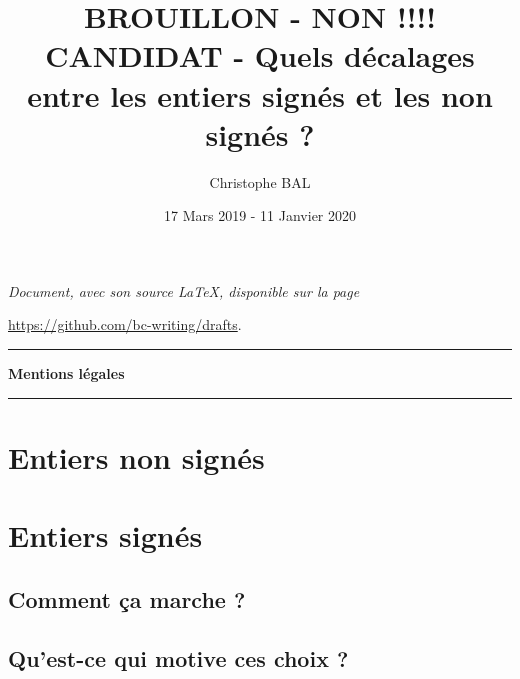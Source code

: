 \documentclass[12pt]{amsart}
\begin{document}
\title{BROUILLON - NON !!!! CANDIDAT - Quels décalages entre les entiers signés et les non signés ?}
\author{Christophe BAL}
\date{17 Mars 2019 - 11 Janvier 2020}

\maketitle

\begin{center}
	\itshape
	Document, avec son source \LaTeX, disponible sur la page
	
	\url{https://github.com/bc-writing/drafts}.
\end{center}


\bigskip


\begin{center}
	\hrule\vspace{.3em}
	{
		\fontsize{1.35em}{1em}\selectfont
		\textbf{Mentions \og légales \fg}
	}
			
	\vspace{0.45em}
	\doclicenseThis
	\hrule
\end{center}

	
\bigskip
\setcounter{tocdepth}{2}
\tableofcontents





\section{Entiers non signés}






\section{Entiers signés}

\subsection{Comment ça marche ?}




\subsection{Qu'est-ce qui motive ces choix ?}


\end{document}
